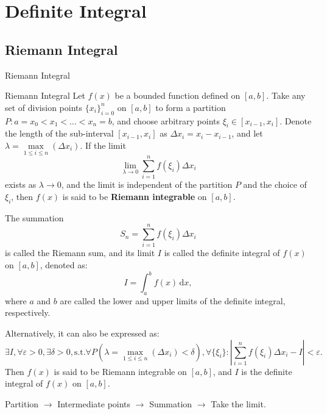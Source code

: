 \documentclass[11pt]{../../TexTemplate/elegantbook}
\begin{document}
\chapter{Definite Integral}
\section{Riemann Integral}
\begin{leftbarTitle}{Riemann Integral}\end{leftbarTitle}
\begin{definition}{Riemann Integral}
    Let \( f(x) \) be a bounded function defined on \( [a, b] \). 
    Take any set of division points \( \{x_i\}_{i=0}^n \) on \( [a, b] \) 
    to form a partition \( P: a = x_0 < x_1 < \dots < x_n = b \), 
    and choose arbitrary points \( \xi_i \in [x_{i-1}, x_i] \). 
    Denote the length of the sub-interval \( [x_{i-1}, x_i] \) 
    as \( \Delta x_i = x_i - x_{i-1} \), 
    and let \( \lambda = \max\limits_{1 \leqslant i \leqslant n} (\Delta x_i) \). 
    If the limit  
    \[
    \lim_{\lambda \to 0} \sum_{i=1}^n f(\xi_i) \Delta x_i
    \]  
    exists as \( \lambda \to 0 \), 
    and the limit is independent of the partition \( P \) and 
    the choice of \( \xi_i \), 
    then \( f(x) \) is said to be \textbf{Riemann integrable} on \( [a, b] \).

    The summation  
    \[
    S_n = \sum_{i=1}^n f(\xi_i) \Delta x_i
    \]  
    is called the Riemann sum, 
    and its limit \( I \) is called the definite integral of \( f(x) \) on \( [a, b] \), 
    denoted as:  
    \[
    I = \int_a^b f(x) \, \mathrm{d}x,
    \]  
    where \( a \) and \( b \) are called the lower and upper limits of the definite integral, respectively.

    Alternatively, it can also be expressed as:  
    \[
    \exists I, \forall \varepsilon > 0, \exists \delta > 0, \text{s.t.} \forall P
    (\lambda = \max\limits_{1 \leqslant i \leqslant n} (\Delta x_i) < \delta), \forall \{\xi_i\}:
    \left| \sum_{i=1}^n f(\xi_i) \Delta x_i - I \right| < \varepsilon.
    \] 
    Then \( f(x) \) is said to be Riemann integrable on \( [a, b] \), 
    and \( I \) is the definite integral of \( f(x) \) on \( [a, b] \).
\end{definition}

\begin{remark}
    Partition \(\to\) Intermediate points \(\to\) Summation \(\to\) Take the limit.
\end{remark}
\end{document}
